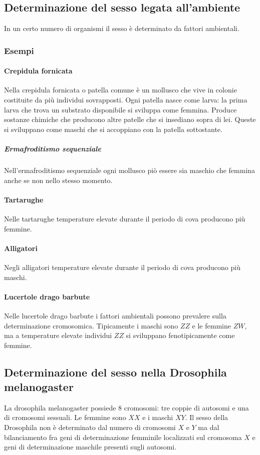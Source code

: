 	\subsection{Determinazione del sesso legata all'ambiente}
	In un certo numero di organismi il sesso \`e determinato da fattori ambientali. 

		\subsubsection{Esempi}

			\paragraph{Crepidula fornicata}
			Nella crepidula fornicata o patella comune \`e un mollusco che vive in colonie costituite da pi\`u individui sovrapposti. 
			Ogni patella nasce come larva: la prima larva che trova un substrato disponibile si sviluppa come femmina.
			Produce sostanze chimiche che producono altre patelle che si insediano sopra di lei.
			Queste si sviluppano come maschi che si accoppiano con la patella sottostante.

				\subparagraph{Ermafroditismo sequenziale}
				Nell'ermafroditismo sequenziale ogni mollusco pi\`o essere sia maschio che femmina anche se non nello stesso momento.

			\paragraph{Tartarughe}
			Nelle tartarughe temperature elevate durante il periodo di cova producono pi\`u femmine.
	
			\paragraph{Alligatori}
			Negli alligatori temperature elevate durante il periodo di cova producono pi\`u maschi.

			\paragraph{Lucertole drago barbute}
			Nelle lucertole drago barbute i fattori ambientali possono prevalere sulla determinazione cromosomica.
			Tipicamente i maschi sono $ZZ$ e le femmine $ZW$, ma a temperature elevate individui $ZZ$ si sviluppano fenotipicamente come femmine.

	\subsection{Determinazione del sesso nella Drosophila melanogaster}
	La drosophila melanogaster possiede $8$ cromosomi: tre coppie di autosomi e una di cromosomi sessuali.
	Le femmine sono $XX$ e i maschi $XY$.
	Il sesso della Drosophila non \`e determinato dal numero di cromosomi $X$ e $Y$ ma dal bilanciamento fra geni di determinazione femminile localizzati sul cromosoma $X$ e geni di determinazione maschile presenti sugli autosomi.
	

